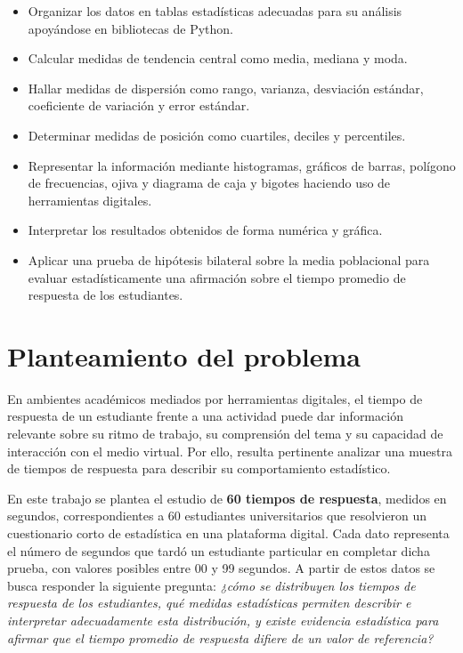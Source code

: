 \documentclass[12pt,letterpaper]{article}
\begin{document}
\begin{itemize}[leftmargin=1.2cm]
    \item Organizar los datos en tablas estadísticas adecuadas para su análisis apoyándose en bibliotecas de Python.
    \item Calcular medidas de tendencia central como media, mediana y moda.
    \item Hallar medidas de dispersión como rango, varianza, desviación estándar, coeficiente de variación y error estándar.
    \item Determinar medidas de posición como cuartiles, deciles y percentiles.
    \item Representar la información mediante histogramas, gráficos de barras, polígono de frecuencias, ojiva y diagrama de caja y bigotes haciendo uso de herramientas digitales.
    \item Interpretar los resultados obtenidos de forma numérica y gráfica.
    \item Aplicar una prueba de hipótesis bilateral sobre la media poblacional para
      evaluar estadísticamente una afirmación sobre el tiempo promedio de respuesta
      de los estudiantes.
\end{itemize}

 \section{Planteamiento del problema}

En ambientes académicos mediados por herramientas digitales, el tiempo de respuesta de un estudiante frente a una actividad puede dar información relevante sobre su ritmo de trabajo, su comprensión del tema y su capacidad de interacción con el medio virtual. Por ello, resulta pertinente analizar una muestra de tiempos de respuesta para describir su comportamiento estadístico.

En este trabajo se plantea el estudio de \textbf{60 tiempos de respuesta}, medidos en segundos, correspondientes a 60 estudiantes universitarios que resolvieron un cuestionario corto de estadística en una plataforma digital. Cada dato representa el número de segundos que tardó un estudiante particular en completar dicha prueba, con valores posibles entre 00 y 99 segundos. A partir de estos datos se busca responder la siguiente pregunta:
\textit{¿cómo se distribuyen los tiempos de respuesta de los estudiantes,
qué medidas estadísticas permiten describir e interpretar adecuadamente
esta distribución, y existe evidencia estadística para afirmar que el
tiempo promedio de respuesta difiere de un valor de referencia?}
\end{document}
